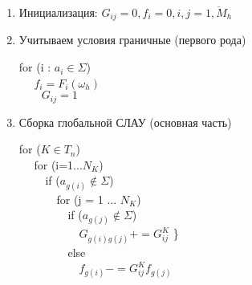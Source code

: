 \documentclass[__main__.tex]{subfiles}
\begin{document}
\begin{enumerate}
	\item Инициализация: $G_{ij} = 0, f_i = 0, i,j = \overline{1,M_h}$
	
	\item Учитываем условия граничные (первого рода)
	
	for (i : $a_i \in \Sigma$) \\
	${\quad}$ $f_i = F_i \left(\omega_h\right)$ \\
	${\quad \quad}G_{ij} = 1$ 


	\item Сборка глобальной СЛАУ (основная часть)
	
	for ($K \in T_n$) \\
	${\quad}$ for (i=1...$N_K$) \\
	${\quad \quad}$ if ($a_{g(i)} \notin \Sigma$) \\
	${\quad \quad \quad}$ for (j = 1 ... $N_K$) \\
	${\quad \quad \quad \quad}$ if ($a_{g(j)}\notin \Sigma$) \\
	${\quad \quad \quad \quad \quad}$ $G_{g(i) g(j)} += G^K_{ij}$ \}\\
	${\quad \quad \quad \quad}$	else \\
	${\quad \quad \quad \quad \quad}$ $f_{g(i)} -= G^K_{ij} f_{g(j)}$ \\
\end{enumerate}
\end{document}
